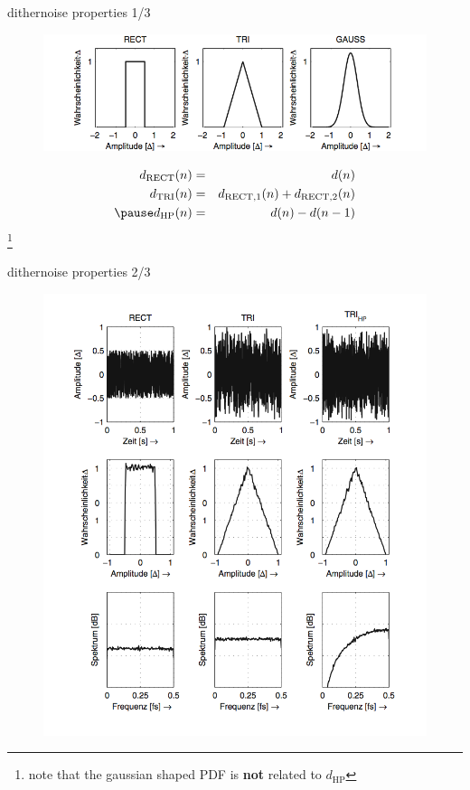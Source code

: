 	\begin{frame}{dither}{noise properties 1/3}
		\begin{figure}[htbp]
			\centering
				\includegraphics[scale=0.8]{Graph/dither_amplitudendichteverteilung.png}
		\end{figure}
		\pause
		\begin{eqnarray*}\label{eq:ditherformen}
			d_\mathrm{RECT}(n) &=& d(n)\\
			d_\mathrm{TRI}(n) &=& d_\mathrm{RECT,1}(n)+d_\mathrm{RECT,2}(n)\\
			\pause
            d_\mathrm{HP}(n) &=& d(n)-d(n-1)
		\end{eqnarray*}
        \footnote{note that the gaussian shaped PDF is \textbf{not} related to $d_\mathrm{HP}$}
	\end{frame}	
	\begin{frame}{dither}{noise properties 2/3}
		\vspace{-3mm}
        \begin{figure}[!hbt]
			\centering
				\includegraphics[scale=0.5]{Graph/noiseadv.png}
		\end{figure}
	\end{frame}	
